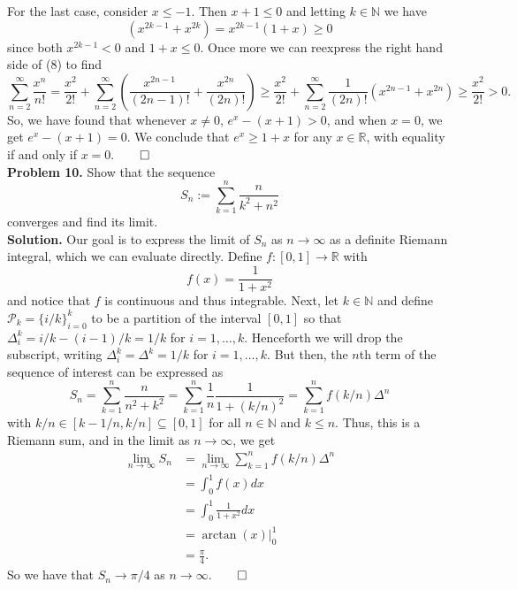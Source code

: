 \documentclass[11pt, letterpaper]{article}
\newcommand{\mbb}[1]{\mathbb{#1}}
\newcommand{\mc}[1]{\mathcal{#1}}
\begin{document}
    For the last case, consider $x\leq-1$. Then $x+1\leq 0$ and letting $k\in\mbb{N}$ we have
    \[(x^{2k-1}+x^{2k})=x^{2k-1}(1+x)\geq 0\]
    since both $x^{2k-1}<0$ and $1+x\leq 0$. Once more we can reexpress the right hand side of (8) to find
    \[\sum_{n=2}^\infty\frac{x^n}{n!}=\frac{x^2}{2!}+\sum_{n=2}^\infty\left(\frac{x^{2n-1}}{(2n-1)!}+\frac{x^{2n}}{(2n)!}\right)\geq\frac{x^2}{2!}+\sum_{n=2}^\infty\frac{1}{(2n)!}\left(x^{2n-1}+x^{2n}\right)\geq\frac{x^2}{2!}>0.\]
    So, we have found that whenever $x\neq 0$, $e^x-(x+1)>0$, and when $x=0$, we get $e^x-(x+1)=0$. We conclude that $e^x\geq 1+x$ for any $x\in\mbb{R}$, with
    equality if and only if $x=0$.\hfill{$\qed$}\\[10pt]
    {\bf Problem 10.} Show that the sequence 
    \[S_n:=\sum_{k=1}^n\frac{n}{k^2+n^2}\]
    converges and find its limit.\\[10pt]
    {\bf Solution.} Our goal is to express the limit of $S_n$ as $n\rightarrow\infty$ as a definite Riemann integral, which we can evaluate directly. Define $f:[0,1]\rightarrow\mbb{R}$ with
    \[f(x)=\frac{1}{1+x^2}\]
    and notice that $f$ is continuous and thus integrable. Next, let $k\in\mbb{N}$ and define $\mc{P}_k=\{i/k\}_{i=0}^k$ to be a partition of the interval $[0,1]$ so that
    $\Delta^k_i=i/k-(i-1)/k=1/k$ for $i=1,\dots,k$. Henceforth we will drop the subscript, writing $\Delta_i^k=\Delta^k=1/k$ for $i=1,\dots, k$. But then, the $n$th term of the sequence of interest can be expressed as
    \[S_n=\sum_{k=1}^n\frac{n}{n^2+k^2}=\sum_{k=1}^n\frac{1}{n}\frac{1}{1+(k/n)^2}=\sum_{k=1}^nf(k/n)\Delta^n\]
    with $k/n\in[k-1/n,k/n]\subseteq[0,1]$ for all $n\in\mbb{N}$ and $k\leq n$. Thus, this is a Riemann sum, and in the limit as $n\rightarrow\infty$, we get
    \begin{align*}
        \lim_{n\rightarrow\infty}S_n&=\lim_{n\rightarrow\infty}\sum_{k=1}^nf(k/n)\Delta^n\\
        &=\int_0^1f(x)dx\\
        &=\int_0^1\frac{1}{1+x^2}dx\\
        &=\arctan(x)\bigg|^1_0\\
        &=\frac{\pi}{4}.
    \end{align*}
    So we have that $S_n\rightarrow\pi/4$ as $n\rightarrow\infty$.\hfill{$\qed$}
    
\end{document}
